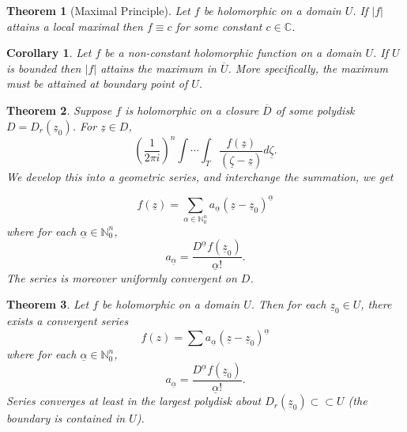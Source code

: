 \documentclass{article}
\newtheorem{theorem}{Theorem} [section]
\newtheorem{corollary}{Corollary} [section]
\newcommand{\N}[0]{\mathbb{N}}
\newcommand{\C}[0]{\mathbb{C}}
\newcommand{\compembed}[0]{\subset\subset}
\begin{document}
\begin{theorem}[Maximal Principle]
  \label{theorem_max_principle}
Let $f$ be holomorphic on a domain $U$. If $\vert f\vert$ attains a local maximal then $f\equiv c$ for some constant $c\in \C$.
\end{theorem}

\begin{corollary}
  Let $f$ be a non-constant holomorphic function on a domain $U$. If $U$ is bounded then $\vert f\vert$ attains the maximum in $\overline{U}$. More specifically, the maximum must be attained at boundary point of $U$.
\end{corollary}

\begin{theorem}
Suppose $f$ is holomorphic on a closure $\overline{D}$ of some polydisk $D=D_r(\underline{z}_0)$. For $\underline{z}\in D$, 
\begin{equation*}
\left({\frac 1 {2\pi i}}\right)^n\int\cdots\int_T {\frac {f(\underline{z})} {(\underline{\zeta}-\underline{z})}}d\underline{\zeta}. %
\end{equation*}
We develop this into a geometric series, and interchange the summation, we get

\begin{equation*}
f(\underline{z}) = \sum_{\alpha\in\N_0^n}a_{\underline{\alpha}}(\underline{z}-\underline{z}_0)^{\underline{\alpha}}
\end{equation*}
where for each $\underline{\alpha}\in\N_0^n$,
\begin{equation*}
a_{\underline{\alpha}} = {\frac {D^{\underline{\alpha}}f(\underline{z}_0)} {\underline{\alpha}!}}.
\end{equation*}
The series is moreover uniformly convergent on $D$.
\end{theorem}

\begin{theorem}
Let $f$ be holomorphic on a domain $U$. Then for each $\underline{z}_0\in U$, there exists a convergent series
\begin{equation*}
f(z) = \sum a_{\underline{\alpha}}(\underline{z}-\underline{z}_0)^{\underline{\alpha}}
\end{equation*}
where for each $\underline{\alpha}\in\N_0^n$,
\begin{equation*}
a_{\underline{\alpha}} = {\frac {D^{\underline{\alpha}}f(\underline{z}_0)} {\underline{\alpha}!}}.
\end{equation*}
Series converges at least in the largest polydisk about $D_r(\underline{z}_0)\compembed U$ (the boundary is contained in $U$).
\end{theorem}
\end{document}
